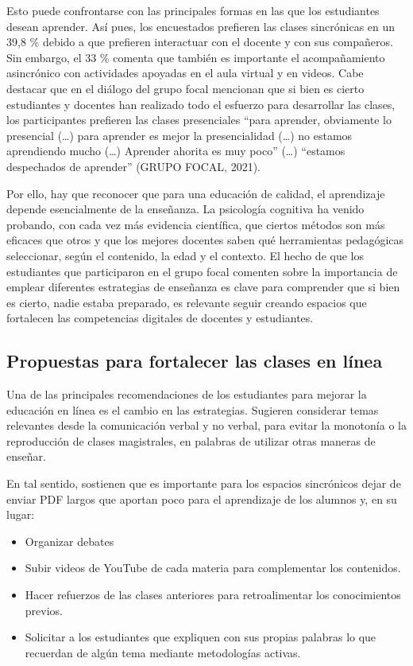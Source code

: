 \documentclass{textolivre}
\begin{document}
Esto puede confrontarse con las principales formas en las que los estudiantes desean aprender. Así pues, los encuestados prefieren las clases sincrónicas en un 39,8 \% debido a que prefieren interactuar con el docente y con sus compañeros. Sin embargo, el 33 \% comenta que también es importante el acompañamiento asincrónico con actividades apoyadas en el aula virtual y en videos. Cabe destacar que en el diálogo del grupo focal mencionan que si bien es cierto estudiantes y docentes han realizado todo el esfuerzo para desarrollar las clases, los participantes prefieren las clases presenciales “para aprender, obviamente lo presencial (…) para aprender es mejor la presencialidad (…) no estamos aprendiendo mucho (…) Aprender ahorita es muy poco” (…) “estamos despechados de aprender” (GRUPO FOCAL, 2021).

Por ello, hay que reconocer que para una educación de calidad, el aprendizaje depende esencialmente de la enseñanza. La psicología cognitiva ha venido probando, con cada vez más evidencia científica, que ciertos métodos son más eficaces que otros y que los mejores docentes saben qué herramientas pedagógicas seleccionar, según el contenido, la edad y el contexto. El hecho de que los estudiantes que participaron en el grupo focal comenten sobre la importancia de emplear diferentes estrategias de enseñanza es clave para comprender que si bien es cierto, nadie estaba preparado, es relevante seguir creando espacios que fortalecen las competencias digitales de docentes y estudiantes. 

\subsection{Propuestas para fortalecer las clases en línea}\label{sec-modelo}
Una de las principales recomendaciones de los estudiantes para mejorar la educación en línea es el cambio en las estrategias. Sugieren considerar temas relevantes desde la comunicación verbal y no verbal, para evitar la monotonía o la reproducción de clases magistrales, en palabras de \textcite{vinals_blanco_rol_2016} utilizar otras maneras de enseñar.

En tal sentido, sostienen que es importante para los espacios sincrónicos dejar de enviar PDF largos que aportan poco para el aprendizaje de los alumnos y, en su lugar:

\begin{itemize}
    \item Organizar debates
    \item Subir videos de YouTube de cada materia para complementar los contenidos.
    \item  Hacer refuerzos de las clases anteriores para retroalimentar los conocimientos previos. 
    \item Solicitar a los estudiantes que expliquen con sus propias palabras lo que recuerdan de algún tema mediante metodologías activas.
\end{itemize}
\end{document}
